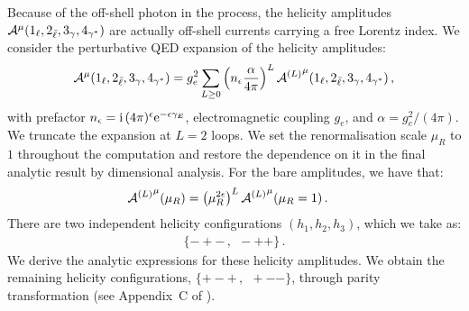 \documentclass[main.tex]{subfiles}
\begin{document}
Because of the off-shell photon in the process, the helicity amplitudes $\mathcal{A}^{\mu}(1_\ell,2_{\bar\ell},3_\gamma,4_{\gamma^*})$ are actually off-shell currents carrying a free Lorentz index.
We consider the perturbative QED expansion of the helicity amplitudes:
\begin{align} \label{eqQED:loopdecomp}
    \mathcal{A}^{\mu}(1_\ell,2_{\bar\ell},3_\gamma,4_{\gamma^*}) = g_e^2 \sum_{L\ge 0} \left( n_\epsilon \frac{\alpha}{4\pi} \right)^L {\mathcal{A}^{(L)}}^{\mu}(1_\ell,2_{\bar\ell},3_\gamma,4_{\gamma^*}) \,,
\end{align}
with prefactor $n_\epsilon=\mathrm{i}\, (4\pi)^\epsilon \mathrm{e}^{-\epsilon\gamma_E}$, electromagnetic coupling $g_e$, and $\alpha=g_e^2/(4\pi)$.
We truncate the expansion at $L=2$ loops.
We set the renormalisation scale $\mu_R$ to $1$ throughout the computation and restore the dependence on it in the final analytic result by dimensional analysis. For the bare amplitudes, we have that:
\begin{align}
    \label{eqQED:scale-restoration}
    {\mathcal{A}^{(L)}}^{\mu}(\mu_R) &= \left(\mu_R^{2\epsilon} \right)^ L {\mathcal{A}^{(L)}}^{\mu}(\mu_R=1) \,.
\end{align}
There are two independent helicity configurations $(h_1,h_2,h_3)$, which we take as:
\begin{align} \label{eqQED:helconfs}
    \{-+- \,, \ \ -++\} \,.
\end{align}
We derive the analytic expressions for these helicity amplitudes.
We obtain the remaining helicity configurations, $\{+-+ \,,\ \ +--\}$, through parity transformation (see Appendix~C of ).
\end{document}
